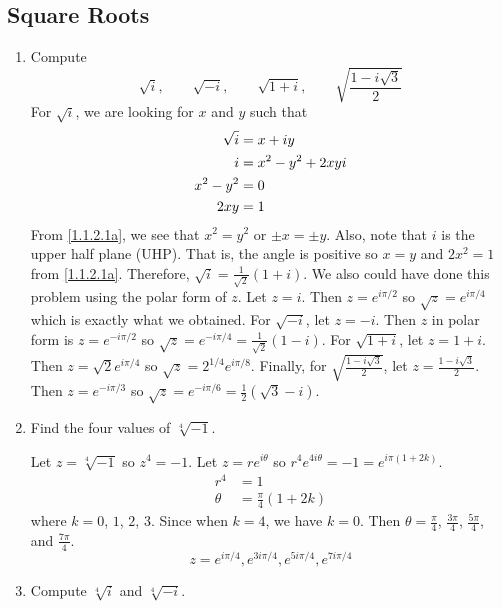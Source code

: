 \subsection{Square Roots}

\begin{enumerate}
\item
  Compute
  \[
  \sqrt{i}, \qquad \sqrt{-i}, \qquad \sqrt{1 + i}, \qquad
  \sqrt{\frac{1 - i\sqrt{3}}{2}}
  \]
  For \(\sqrt{i}\), we are looking for \(x\) and \(y\) such that
  \begin{align}
    \sqrt{i} & = x + iy\notag\\
    i & = x^2 - y^2 + 2xyi\notag\\
    x^2 - y^2 & = 0\label{1.1.2.1a}\\
    2xy & = 1\label{1.1.2.1b}
  \end{align}
  From \cref{1.1.2.1a}, we see that \(x^2 = y^2\) or \(\pm x = \pm y\).
  Also, note that \(i\) is the upper half plane (UHP).
  That is, the angle is positive so \(x = y\) and \(2x^2 = 1\) from
  \cref{1.1.2.1a}.
  Therefore, \(\sqrt{i} = \frac{1}{\sqrt{2}}(1 + i)\).
  We also could have done this problem using the polar form of \(z\).
  Let \(z = i\).
  Then \(z = e^{i\pi/2}\) so \(\sqrt{z} = e^{i\pi/4}\) which is exactly what we
  obtained.
  For \(\sqrt{-i}\), let \(z = -i\).
  Then \(z\) in polar form is \(z = e^{-i\pi/2}\) so
  \(\sqrt{z} = e^{-i\pi/4} = \frac{1}{\sqrt{2}}(1 - i)\).
  For \(\sqrt{1 + i}\), let \(z = 1 + i\).
  Then \(z = \sqrt{2}e^{i\pi/4}\) so \(\sqrt{z} = 2^{1/4}e^{i\pi/8}\).
  Finally, for \(\sqrt{\frac{1 - i\sqrt{3}}{2}}\), let
  \(z = \frac{1 - i\sqrt{3}}{2}\).
  Then \(z = e^{-i\pi/3}\) so
  \(\sqrt{z} = e^{-i\pi/6} = \frac{1}{2}(\sqrt{3} - i)\).
\item
  Find the four values of \(\sqrt[4]{-1}\).
  \par\smallskip
  Let \(z = \sqrt[4]{-1}\) so \(z^4 = -1\).
  Let \(z = re^{i\theta}\) so \(r^4e^{4i\theta} = -1 = e^{i\pi(1 + 2k)}\).
    \begin{align*}
      r^4 & = 1\\
      \theta & = \frac{\pi}{4}(1 + 2k)
    \end{align*}
    where \(k = 0\), \(1\), \(2\), \(3\).
    Since when \(k = 4\), we have \(k = 0\).
    Then \(\theta = \frac{\pi}{4}\), \(\frac{3\pi}{4}\), \(\frac{5\pi}{4}\),
    and \(\frac{7\pi}{4}\).
    \[
    z = e^{i\pi/4}, e^{3i\pi/4}, e^{5i\pi/4}, e^{7i\pi/4}
    \]
\item
  Compute \(\sqrt[4]{i}\) and \(\sqrt[4]{-i}\).
  \par\smallskip

\end{enumerate}

